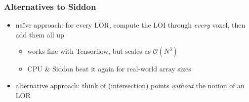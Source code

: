 \documentclass{beamer}
\begin{document}
\begin{frame}
  \frametitle{Alternatives to Siddon}
  \begin{itemize}
    \item na\"ive approach: for every LOR, compute the LOI through \textsl{every} voxel, then add them all up
      \begin{itemize}
        \item works fine with Tensorflow, but scales as $\mathcal{O}(N^3)$
        \item CPU \& Siddon beat it again for real-world array sizes
      \end{itemize}
    \pause
    \item alternative approach: think of (intersection) points \textsl{without} the notion of an LOR
  \end{itemize}
  \pause
  \begin{figure}
    \centering
  \end{figure}
\end{frame}
\end{document}
